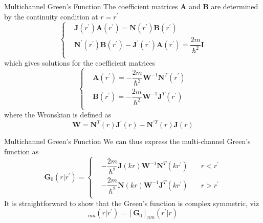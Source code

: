\documentclass{beamer}
\begin{document}
	\begin{frame}{Multichannel Green's Function}
		The coefficient matrices $\mathbf{A}$ and $\mathbf{B}$ are determined by the continuity condition at $r=r^\prime$
		 \begin{equation}
		 	\left\{
		 	\begin{aligned}
		 		&\mathbf{J}(r^\prime)\mathbf{A}(r^\prime)=\mathbf{N}(r^\prime)\mathbf{B}(r^\prime)\\
		 		&\mathbf{N}^\prime(r^\prime)\mathbf{B}(r^\prime)-\mathbf{J}^\prime(r^\prime)\mathbf{A}(r^\prime)=\dfrac{2m}{\hbar^2}\mathbf{I}\\
		 	\end{aligned}
		 	\right
		 	.
		 \end{equation}
		 which gives solutions for the coefficient matrices
		 \begin{equation}
		 	\left\{
		 	\begin{aligned}
		 		&\mathbf{A}(r^\prime)=-\dfrac{2m}{\hbar^2}\mathbf{W}^{-1}\mathbf{N}^T(r^\prime)\\
		 		&\mathbf{B}(r^\prime)=-\dfrac{2m}{\hbar^2}\mathbf{W}^{-1}\mathbf{J}^T(r^\prime)\\
		 	\end{aligned}
		 	\right
		 	.
		 \end{equation}
		 where the Wronskian is defined as
		 \begin{equation}
		 	\mathbf{W}=\mathbf{N}^T(r)\mathbf{J}^\prime(r)-\mathbf{N}^{\prime T}(r)\mathbf{J}(r)
		 \end{equation}
	\end{frame}
	\begin{frame}{Multichannel Green's Function}
		We can thus express the multi-channel Green's function as
		\begin{equation}
			\mathbf{G}_0(r|r^\prime)=
			\left\{
			\begin{aligned}
				&-\dfrac{2m}{\hbar^2}\mathbf{J}(kr)\mathbf{W}^{-1}\mathbf{N}^T(kr^\prime)\quad&r<r^\prime\\
				&-\dfrac{2m}{\hbar^2}\mathbf{N}(kr)\mathbf{W}^{-1}\mathbf{J}^T(kr^\prime)\quad&r>r^\prime\\
			\end{aligned}
			\right
			.
		\end{equation}
		It is straightforward to show that the Green's function is complex symmetric, viz
		\begin{equation}
			[\mathbf{G}_0]_{mn}(r|r^\prime)=[\mathbf{G}_0]_{nm}(r^\prime|r)
		\end{equation}
	\end{frame}
\end{document}
